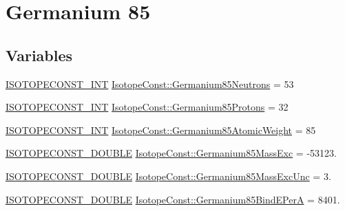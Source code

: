 \hypertarget{group___isotope_const-_germanium-_ge85}{}\section{Germanium 85}
\label{group___isotope_const-_germanium-_ge85}
\subsection*{Variables}
\begin{DoxyCompactItemize}
\item 
\mbox{\hyperlink{group___isotope_const-_macros_ga5f18360b3e99483a35c32d789e62621c}{I\+S\+O\+T\+O\+P\+E\+C\+O\+N\+S\+T\+\_\+\+I\+NT}} \mbox{\hyperlink{group___isotope_const-_germanium-_ge85_ga2e31e38dc050a0ed68867686cb0b0fe3}{Isotope\+Const\+::\+Germanium85\+Neutrons}} = 53
\item 
\mbox{\hyperlink{group___isotope_const-_macros_ga5f18360b3e99483a35c32d789e62621c}{I\+S\+O\+T\+O\+P\+E\+C\+O\+N\+S\+T\+\_\+\+I\+NT}} \mbox{\hyperlink{group___isotope_const-_germanium-_ge85_ga4c204d4fe5addba7b4dee35585383162}{Isotope\+Const\+::\+Germanium85\+Protons}} = 32
\item 
\mbox{\hyperlink{group___isotope_const-_macros_ga5f18360b3e99483a35c32d789e62621c}{I\+S\+O\+T\+O\+P\+E\+C\+O\+N\+S\+T\+\_\+\+I\+NT}} \mbox{\hyperlink{group___isotope_const-_germanium-_ge85_ga2be206872a3775c5ff9d7029dd97815c}{Isotope\+Const\+::\+Germanium85\+Atomic\+Weight}} = 85
\item 
\mbox{\hyperlink{group___isotope_const-_macros_ga8f45a7272ce02c0b4c65c44636ed719a}{I\+S\+O\+T\+O\+P\+E\+C\+O\+N\+S\+T\+\_\+\+D\+O\+U\+B\+LE}} \mbox{\hyperlink{group___isotope_const-_germanium-_ge85_ga6d2bc4b7adf9c3d1f4a4b186010eb307}{Isotope\+Const\+::\+Germanium85\+Mass\+Exc}} = -\/53123.
\item 
\mbox{\hyperlink{group___isotope_const-_macros_ga8f45a7272ce02c0b4c65c44636ed719a}{I\+S\+O\+T\+O\+P\+E\+C\+O\+N\+S\+T\+\_\+\+D\+O\+U\+B\+LE}} \mbox{\hyperlink{group___isotope_const-_germanium-_ge85_ga68fe78847a220f8d83b6641ecc556512}{Isotope\+Const\+::\+Germanium85\+Mass\+Exc\+Unc}} = 3.
\item 
\mbox{\hyperlink{group___isotope_const-_macros_ga8f45a7272ce02c0b4c65c44636ed719a}{I\+S\+O\+T\+O\+P\+E\+C\+O\+N\+S\+T\+\_\+\+D\+O\+U\+B\+LE}} \mbox{\hyperlink{group___isotope_const-_germanium-_ge85_ga46dd803639c80dc767f746f0216d6b96}{Isotope\+Const\+::\+Germanium85\+Bind\+E\+PerA}} = 8401.
\item 

\end{DoxyCompactItemize}
